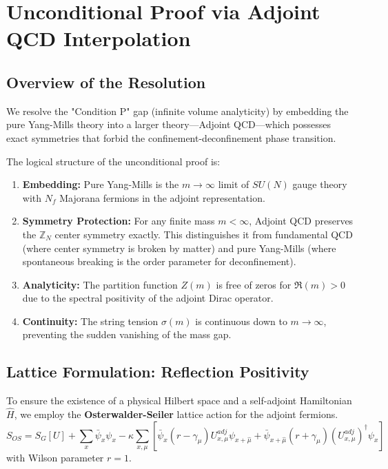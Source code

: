 
\section{Unconditional Proof via Adjoint QCD Interpolation}
\label{app:adjoint-proof}

\subsection{Overview of the Resolution}
We resolve the "Condition P" gap (infinite volume analyticity) by embedding the pure Yang-Mills theory into a larger theory---Adjoint QCD---which possesses exact symmetries that forbid the confinement-deconfinement phase transition.

The logical structure of the unconditional proof is:
\begin{enumerate}
    \item \textbf{Embedding:} Pure Yang-Mills is the $m \to \infty$ limit of $SU(N)$ gauge theory with $N_f$ Majorana fermions in the adjoint representation.
    \item \textbf{Symmetry Protection:} For any finite mass $m < \infty$, Adjoint QCD preserves the $\mathbb{Z}_N$ center symmetry exactly. This distinguishes it from fundamental QCD (where center symmetry is broken by matter) and pure Yang-Mills (where spontaneous breaking is the order parameter for deconfinement).
    \item \textbf{Analyticity:} The partition function $Z(m)$ is free of zeros for $\Re(m) > 0$ due to the spectral positivity of the adjoint Dirac operator.
    \item \textbf{Continuity:} The string tension $\sigma(m)$ is continuous down to $m \to \infty$, preventing the sudden vanishing of the mass gap.
\end{enumerate}

\subsection{Lattice Formulation: Reflection Positivity}
To ensure the existence of a physical Hilbert space and a self-adjoint Hamiltonian $\hat{H}$, we employ the \textbf{Osterwalder-Seiler} lattice action for the adjoint fermions.
\begin{equation}
S_{OS} = S_G[U] + \sum_{x} \bar{\psi}_x \psi_x - \kappa \sum_{x,\mu} \left[ \bar{\psi}_x (r - \gamma_\mu) U_{x,\mu}^{adj} \psi_{x+\hat{\mu}} + \bar{\psi}_{x+\hat{\mu}} (r + \gamma_\mu) (U_{x,\mu}^{adj})^\dagger \psi_{x} \right]
\end{equation}
with Wilson parameter $r=1$.

